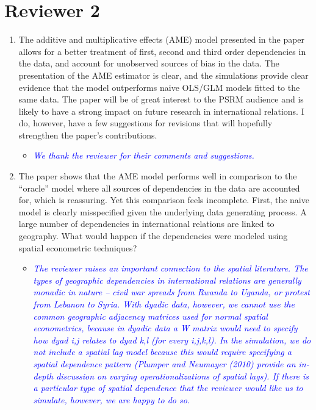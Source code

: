 \section*{Reviewer 2}

\begin{enumerate}
	\item The additive and multiplicative effects (AME) model presented in the paper allows for a better treatment of first, second and third order dependencies in the data, and account for unobserved sources of bias in the data. The presentation of the AME estimator is clear, and the simulations provide clear evidence that the model outperforms naive OLS/GLM models fitted to the same data. The paper will be of great interest to the PSRM audience and is likely to have a strong impact on future research in international relations. I do, however, have a few suggestions for revisions that will hopefully strengthen the paper’s contributions.
	\begin{itemize}
		\item \textcolor{blue}{ \emph{
		We thank the reviewer for their comments and suggestions.
		}}
	\end{itemize}
	\item The paper shows that the AME model performs well in comparison to the “oracle” model where all sources of dependencies in the data are accounted for, which is reassuring. Yet this comparison feels incomplete. First, the naive model is clearly misspecified given the underlying data generating process. A large number of dependencies in international relations are linked to geography. What would happen if the dependencies were modeled using spatial econometric techniques?
	\begin{itemize}
		\item \textcolor{blue}{ \emph{
			The reviewer raises an important connection to the spatial literature. The types of geographic dependencies in international relations are generally monadic in nature -- civil war spreads from Rwanda to Uganda, or protest from Lebanon to Syria. With dyadic data, however, we cannot use the common geographic adjacency matrices used for normal spatial econometrics, because in dyadic data a W matrix would need to specify how dyad i,j relates to dyad k,l (for every i,j,k,l). In the simulation, we do not include a spatial lag model because this would require specifying a spatial dependence pattern (Plumper and Neumayer (2010) provide an in-depth discussion on varying operationalizations of spatial lags). If there is a particular type of spatial dependence that the reviewer would like us to simulate, however, we are happy to do so.
}}
\end{itemize}
\end{enumerate}
